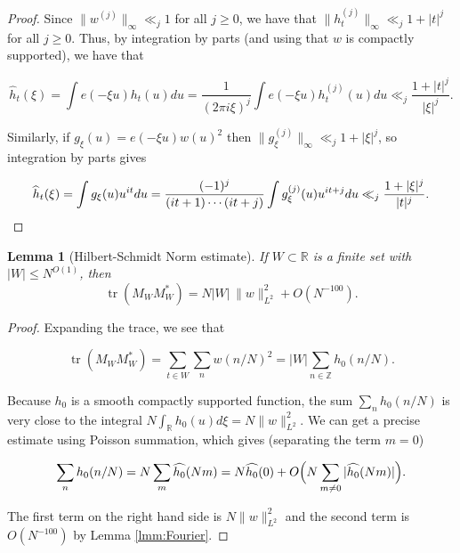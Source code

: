\documentclass{amsart}
\theoremstyle{plain}
\newtheorem{lmm}[thrm]{Lemma}
\numberwithin{equation}{section}
\DeclareMathOperator*{\tr}{tr}
\newcommand{\ZZ}{\mathbb{Z}}
\newcommand{\RR}{\mathbb{R}}
\begin{document}
\begin{proof}
Since $\|w^{(j)}\|_\infty\ll_j 1$ for all $j\ge 0$, we have that $\|h_t^{(j)}\|_\infty\ll_j 1+|t|^j$ for all $j\ge 0$. Thus, by integration by parts (and using that $w$ is compactly supported), we have that

\[
\widehat{h}_t(\xi)=\int e(-\xi u)h_t(u)du=\frac{1}{(2\pi i\xi)^j}\int e(-\xi u)h_t^{(j)}(u)du\ll_j \frac{1+|t|^j}{|\xi|^j}.
\]

Similarly, if $g_\xi(u)=e(-\xi u)w(u)^2$ then $\|g_\xi^{(j)}\|_\infty\ll_j 1+|\xi|^j$, so integration by parts gives

\[
\widehat{h}_t(\xi)=\int g_\xi(u)u^{it}du=\frac{(-1)^j}{(it+1)\cdots (it+j)}\int g_\xi^{(j)}(u)u^{it+j}du\ll_j \frac{1+|\xi|^j}{|t|^j}.\qedhere
\]
\end{proof}

%
%


\begin{lmm}[Hilbert-Schmidt Norm estimate]\label{sumsi2}
 If $W \subset \RR$ is a finite set with $|W| \le N^{O(1)}$, then
\[
\tr(M_W M_W^*) = N |W| \,\| w \|_{L^2}^2 +  O(N^{-100}).
\]
\end{lmm}

\begin{proof}
Expanding the trace, we see that

\[
\tr(M_W M_W^*) =\sum_{t \in W}\sum_{ n } w(n/N)^2 = |W| \sum_{n \in \ZZ} h_0(n/N). 
 \]
 
Because $h_0$ is a smooth compactly supported function, the sum $\sum_n h_0(n/N)$ is very close to the integral $N \int_\RR h_0(u) d \xi = N \| w \|_{L^2}^2$.   We can get a precise estimate using Poisson summation, which gives (separating the term $m=0$)

\[
 \sum_n h_0(n/N) = N \sum_m \widehat{h_0} (N m) = N\widehat{h_0}(0)+O\Bigl(N\sum_{m\ne 0}|\widehat{h_0}(N m)|\Bigr).
  \]
  
The first term on the right hand side is $N\|w\|_{L^2}^2$ and the second term is $O(N^{-100})$ by Lemma \ref{lmm:Fourier}.
\end{proof}

%
%
\end{document}
